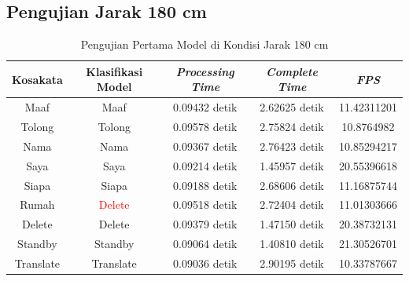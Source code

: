 \newpage
\subsection{Pengujian Jarak 180 cm}
\label{sec:analisisjarak1}

\begin{longtable}{|c|c|c|c|c|}
  \caption{Pengujian Pertama Model di Kondisi Jarak 180 cm}
  \label{tb:prediksipendek1}                                   \\
  \hline
  \rowcolor[HTML]{C0C0C0}
  \textbf{Kosakata} & \textbf{Klasifikasi Model} & \textbf{\emph{Processing Time}} & \textbf{\emph{Complete Time}} & \textbf{\emph{FPS}}\\
  \hline
  Maaf              & Maaf                          & 0.09432 detik                           & 2.62625 detik                                 & 11.42311201\\
  Tolong            & Tolong                        & 0.09578 detik                           & 2.75824 detik                                 & 10.8764982\\
  Nama              & Nama                          & 0.09367 detik                           & 2.76423 detik                                 & 10.85294217\\
  Saya              & Saya                          & 0.09214 detik                           & 1.45957 detik                                 & 20.55396618\\
  Siapa             & Siapa                         & 0.09188 detik                           & 2.68606 detik                                 & 11.16875744\\
  Rumah             & \textcolor{red}{Delete}       & 0.09518 detik                           & 2.72404 detik                                 & 11.01303666\\
  Delete            & Delete                        & 0.09379 detik                           & 1.47150 detik                                 & 20.38732131\\
  Standby           & Standby                       & 0.09064 detik                           & 1.40810 detik                                 & 21.30526701\\
  Translate         & Translate                     & 0.09036 detik                           & 2.90195 detik                                 & 10.33787667\\
  \hline
\end{longtable}


